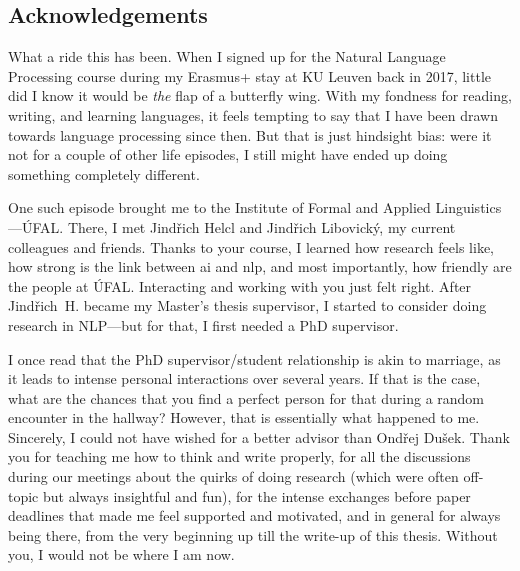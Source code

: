 \documentclass[12pt,notitlepage,a4paper,openright]{report}
\begin{document}
\subsection*{Acknowledgements}
{
    What a ride this has been. When I signed up for the Natural Language Processing course during my Erasmus+ stay at KU Leuven back in 2017, little did I know it would be \emph{the} flap of a butterfly wing. With my fondness for reading, writing, and learning languages, it feels tempting to say that I have been drawn towards language processing since then. But that is just hindsight bias: were it not for a couple of other life episodes, I still might have ended up doing something completely different.

    One such episode brought me to the Institute of Formal and Applied Linguistics---ÚFAL. There, I met Jindřich Helcl and Jindřich Libovický, my current colleagues and friends. Thanks to your course, I learned how research feels like, how strong is the link between \acs{ai} and \acs{nlp}, and most importantly, how friendly are the people at ÚFAL. Interacting and working with you just felt right. After Jindřich~H. became my Master's thesis supervisor, I started to consider doing research in NLP---but for that, I first needed a PhD supervisor.

    I once read that the PhD supervisor/student relationship is akin to marriage, as it leads to intense personal interactions over several years. If that is the case, what are the chances that you find a perfect person for that during a random encounter in the hallway?
    However, that is essentially what happened to me.
    Sincerely, I could not have wished for a better advisor than Ondřej Dušek. Thank you for teaching me how to think and write properly, for all the discussions during our meetings about the quirks of doing research (which were often off-topic but always insightful and fun), for the intense exchanges before paper deadlines that made me feel supported and motivated, and in general for always being there, from the very beginning up till the write-up of this thesis. Without you, I would not be where I am now.

}
\end{document}
